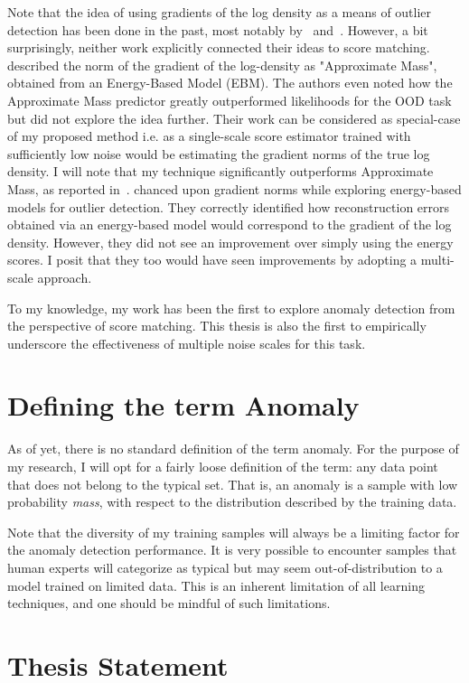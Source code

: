 Note that the idea of using gradients of the log density as a means of outlier detection has been done in the past, most notably by~\cite{Grathwohl2020Your} and~\cite{pmlr-v48-zhai16}. However, a bit surprisingly, neither work explicitly connected their ideas to score matching. \cite{Grathwohl2020Your} described the norm of the gradient of the log-density as "Approximate Mass", obtained from an Energy-Based Model (EBM). The authors even noted how the Approximate Mass predictor greatly outperformed likelihoods for the OOD task but did not explore the idea further. Their work can be considered as special-case of my proposed method i.e. as a single-scale score estimator trained with sufficiently low noise would be estimating the gradient norms of the true log density. I will note that my technique significantly outperforms Approximate Mass, as reported in~\cite{mahmood2021multiscale}. \cite{pmlr-v48-zhai16} chanced upon gradient norms while exploring energy-based models for outlier detection. They correctly identified how reconstruction errors obtained via an energy-based model would correspond to the gradient of the log density. However, they did not see an improvement over simply using the energy scores. I posit that they too would have seen improvements by adopting a multi-scale approach. 

To my knowledge, my work has been the first to explore anomaly detection from the perspective of score matching. This thesis is also the first to empirically underscore the effectiveness of multiple noise scales for this task.


\section{Defining the term Anomaly}
As of yet, there is no standard definition of the term anomaly. 
For the purpose of my research, I will opt for a fairly loose definition of the term: any data point that does not belong to the typical set. That is, an anomaly is a sample with low probability \textit{mass}, with respect to the distribution described by the training data. 

Note that the diversity of my training samples will always be a limiting factor for the anomaly detection performance. It is very possible to encounter samples that human experts will categorize as typical but may seem out-of-distribution to a model trained on limited data. This is an inherent limitation of all learning techniques, and one should be mindful of such limitations.

\section{Thesis Statement}


